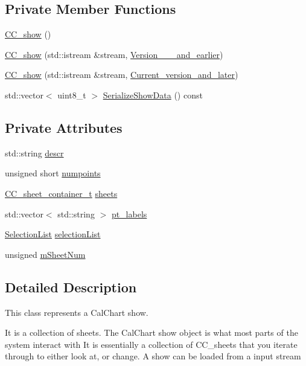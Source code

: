 \subsection*{Private Member Functions}
\begin{DoxyCompactItemize}
\item 
\hyperlink{a00046_aaad29d5808481756f92d5143787c4ff8}{C\-C\-\_\-show} ()
\item 
\hyperlink{a00046_adc42c6c566c4a041667b7a22f711c448}{C\-C\-\_\-show} (std\-::istream \&stream, \hyperlink{a00153}{Version\-\_\-\_\-\_\-and\-\_\-earlier})
\item 
\hyperlink{a00046_ae8f25bb4be47c28b4e2acd3d5ff8147c}{C\-C\-\_\-show} (std\-::istream \&stream, \hyperlink{a00097}{Current\-\_\-version\-\_\-and\-\_\-later})
\item 
std\-::vector$<$ uint8\-\_\-t $>$ \hyperlink{a00046_afa299933b517e795d40af4f61c855dbf}{Serialize\-Show\-Data} () const 
\end{DoxyCompactItemize}
\subsection*{Private Attributes}
\begin{DoxyCompactItemize}
\item 
std\-::string \hyperlink{a00046_a72baae9d4fad57aaef2404b629ffc705}{descr}
\item 
unsigned short \hyperlink{a00046_a5acc69bcdcaafbd1d55ad9b30336d354}{numpoints}
\item 
\hyperlink{a00046_a1a6e11ead9a97c796881971059c56f37}{C\-C\-\_\-sheet\-\_\-container\-\_\-t} \hyperlink{a00046_aba122ad0e7f777f7a643530a10b09c2c}{sheets}
\item 
std\-::vector$<$ std\-::string $>$ \hyperlink{a00046_a4cb9ef4807cdb6c8fcb06175efb8e0c6}{pt\-\_\-labels}
\item 
\hyperlink{a00214_aaec86d4bb87e1e6f0b60e6e551c5e570}{Selection\-List} \hyperlink{a00046_af4e9d7b79816a9180dc4e45a335111e1}{selection\-List}
\item 
unsigned \hyperlink{a00046_a72aca12ebc4ee10758840d0e39d244b2}{m\-Sheet\-Num}
\end{DoxyCompactItemize}


\subsection{Detailed Description}
This class represents a Cal\-Chart show. 

It is a collection of sheets. The Cal\-Chart show object is what most parts of the system interact with It is essentially a collection of C\-C\-\_\-sheets that you iterate through to either look at, or change. A show can be loaded from a input stream 

